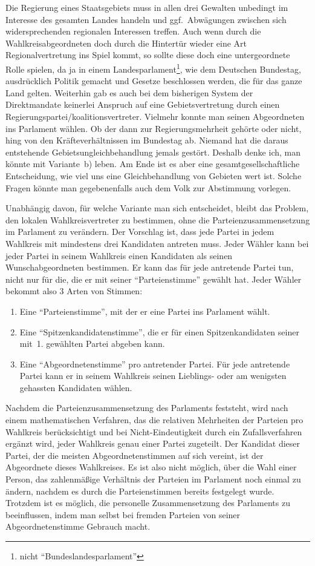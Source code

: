 Die Regierung eines Staatsgebiets muss in allen drei Gewalten unbedingt im Interesse des gesamten
Landes handeln und ggf.\ Abwägungen zwischen sich widersprechenden regionalen Interessen treffen.
Auch wenn durch die Wahlkreisabgeordneten doch durch die Hintertür wieder eine Art
Regionalvertretung ins Spiel kommt, so sollte diese doch eine untergeordnete Rolle spielen, da ja
in einem Landesparlament\footnote{nicht \enquote{Bundeslandesparlament}}, wie dem Deutschen
Bundestag, ausdrücklich Politik gemacht und Gesetze beschlossen werden, die für das ganze Land
gelten. Weiterhin gab es auch bei dem bisherigen System der Direktmandate keinerlei Anspruch auf
eine Gebietsvertretung durch einen Regierungspartei/koalitionsvertreter. Vielmehr konnte man
seinen Abgeordneten ins Parlament wählen. Ob der dann zur Regierungsmehrheit gehörte oder nicht,
hing von den Kräfteverhältnissen im Bundestag ab. Niemand hat die daraus entstehende
Gebietsungleichbehandlung jemals gestört. Deshalb denke ich, man könnte mit Variante~b) leben.
Am Ende ist es aber eine gesamtgesellschaftliche Entscheidung, wie viel uns eine Gleichbehandlung
von Gebieten wert ist. Solche Fragen könnte man gegebenenfalls auch dem Volk zur Abstimmung
vorlegen.

Unabhängig davon, für welche Variante man sich entscheidet, bleibt das Problem, den lokalen
Wahlkreisvertreter zu bestimmen, ohne die Parteienzusammensetzung im Parlament zu verändern. Der
Vorschlag ist, dass jede Partei in jedem Wahlkreis mit mindestens drei Kandidaten antreten muss.
Jeder Wähler kann bei jeder Partei in seinem Wahlkreis einen Kandidaten als seinen
Wunschabgeordneten bestimmen. Er kann das für jede antretende Partei tun, nicht nur für die, die
er mit seiner \enquote{Parteienstimme} gewählt hat. Jeder Wähler bekommt also 3 Arten von
Stimmen:
\begin{enumerate}
  \item Eine \enquote{Parteienstimme}, mit der er eine Partei ins Parlament wählt.
  \item Eine \enquote{Spitzenkandidatenstimme}, die er für einen Spitzenkandidaten seiner mit~1.
    gewählten Partei abgeben kann.
  \item Eine \enquote{Abgeordnetenstimme} pro antretender Partei. Für jede antretende Partei kann
    er in seinem Wahlkreis seinen Lieblings- oder am wenigsten gehassten Kandidaten wählen.
\end{enumerate}
Nachdem die Parteienzusammensetzung des Parlaments feststeht, wird nach einem mathematischen
Verfahren, das die relativen Mehrheiten der Parteien pro Wahlkreis berücksichtigt und bei
Nicht-Eindeutigkeit durch ein Zufallsverfahren ergänzt wird, jeder Wahlkreis genau einer Partei
zugeteilt. Der Kandidat dieser Partei, der die meisten Abgeordnetenstimmen auf sich vereint, ist
der Abgeordnete dieses Wahlkreises. Es ist also nicht möglich, über die Wahl einer Person, das
zahlenmäßige Verhältnis der Parteien im Parlament noch einmal zu ändern, nachdem es durch die
Parteienstimmen bereits festgelegt wurde. Trotzdem ist es möglich, die personelle Zusammensetzung
des Parlaments zu beeinflussen, indem man selbst bei fremden Parteien von seiner
Abgeordnetenstimme Gebrauch macht.

